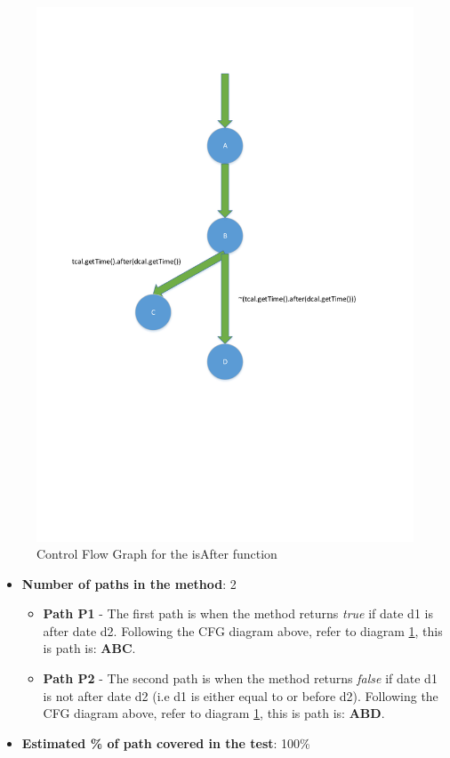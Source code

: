 \documentclass[fontsize=12pt,paper=letter,twoside]{scrartcl}
\begin{document}
\begin{figure}[!htb]
\begin{center}
\includegraphics[width=.99\textwidth]{images/wbt/dtt/dtt_cfg.pdf}
\end{center}
\caption{Control Flow Graph for the isAfter function}
\label{fig:wbt_dtt_cfg}
\end{figure}

\clearpage
\newpage
\begin{itemize}
\item \textbf{Number of paths in the method}: 2
\begin{itemize}
\item \textbf{Path P1} - The first path is when the method returns \emph{true} if date d1 is after date d2. Following the CFG diagram above, refer to diagram \ref{fig:wbt_dtt_cfg}, this is path is: \textbf{ABC}.
\item \textbf{Path P2} - The second path is when the method returns \emph{false} if date d1 is not after date d2 (i.e d1 is either equal to or before d2). Following the CFG diagram above, refer to diagram \ref{fig:wbt_dtt_cfg}, this is path is: \textbf{ABD}.
\end{itemize}
\item \textbf{Estimated \% of path covered in the test}: 100\%
\end{itemize}
\end{document}
